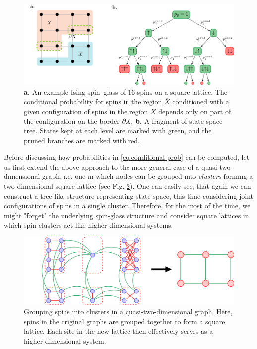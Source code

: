 \begin{figure}
  \centering
  \includegraphics[width=\textwidth]{figures/squarelattice.pdf}
  \caption{\textbf{a.} An example Ising spin--glass  of 16 spins on a square lattice. The conditional probability for spins in the region $\overline{X}$ conditioned with a given configuration of spins in the region $X$ depends only on part of the configuration on the border $\partial X$. \textbf{b.} A fragment of state space tree. States kept at each level
    are marked with green, and the pruned branches are marked with red.}
  \label{fig:lattice-and-border}
\end{figure}

Before discussing how probabilities in \eqref{eq:conditional-prob} can be
computed, let us first extend the above approach to the more general case of a
quasi-two-dimensional graph, i.e. one in which nodes can be grouped into
\emph{clusters} forming a two-dimensional square lattice (see Fig.
\ref{fig:clustering}). One can easily see, that again we can
construct a tree-like structure representing state space, this time considering
joint configurations of spins in a single cluster. Therefore, for the most of
the time, we might "forget" the underlying spin-glass structure and consider
square lattices in which spin clusters act like higher-dimensional systems.

\begin{figure}[b]
  \includegraphics[width=\textwidth]{figures/clustering}
  \caption{Grouping spins into clusters in a quasi-two-dimensional graph. Here, spins in the original graphs
    are grouped together to form a square lattice. Each site in the new lattice then effectively serves as a higher-dimensional system.}
  \label{fig:clustering}
\end{figure}

